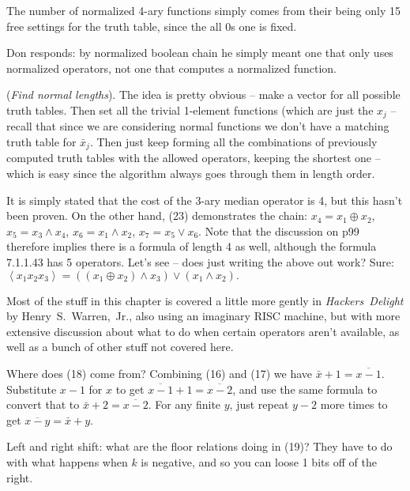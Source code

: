 The number of normalized 4-ary functions simply comes from their being
only 15 free settings for the truth table, since the all 0s one is fixed.

Don responds: by normalized boolean chain he simply meant one
that only uses normalized operators, not one that computes a normalized
function.

\vskip 0.05in  ({\it Find normal lengths}).\hfil\break
The idea is pretty obvious -- make a vector for all possible truth tables.
Then set all the trivial 1-element functions (which are just the $x_j$ --
recall that since we are considering normal functions we don't have
a matching truth table for $\bar x_j$.  Then just keep forming all the
combinations of previously computed truth tables with the allowed operators,
keeping the shortest one -- which is easy since the algorithm always goes
through them in length order.


\noindent [p 107] It is simply stated that the cost of the 3-ary median
operator is 4, but this hasn't been proven.  On the other hand, (23)
demonstrates the chain: $x_4 = x_1 \oplus x_2$, $x_5 = x_3 \land x_4$,
$x_6 = x_1 \land x_2$, $x_7 = x_5 \lor x_6$.  Note that the discussion
on p99 therefore implies there is a formula of length 4 as well, although
the formula 7.1.1.43 has 5 operators.  Let's see -- does just writing
the above out work?  Sure:
$
\left< x_1 x_2 x_3 \right> = \left(\left(x_1 \oplus x_2\right) \land x_3\right)
\lor \left(x_1 \land x_2\right).
$


Most of the stuff in this chapter is covered a little more gently
in {\it Hackers~Delight} by Henry~S.~Warren,~Jr., also using an imaginary RISC machine,
but with more extensive discussion about what to do when certain
operators aren't available, as well as a bunch of other stuff not
covered here.


\noindent [p 135] Where does (18) come from? \hfil\break Combining (16) and
(17) we have $\bar x + 1 = \overline{x - 1}$.  Substitute $x-1$ for $x$
to get $\overline{x - 1} + 1 = \overline{x - 2}$, and use the same
formula to convert that to $\bar x + 2 = \overline{x - 2}$.  For any
finite $y$, just repeat $y-2$ more times to get $\overline{x - y} = \bar x + y$.

\vskip 0.08in \noindent [p 135] Left and right shift: what are the floor
relations doing in (19)?  \hfil\break They have to do with what happens when $k$
is negative, and so you can loose 1 bits off of the right.

